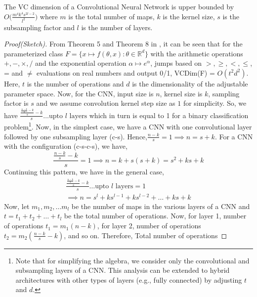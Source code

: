 \documentclass[11pt,a4paper]{article}
\begin{document}
\begin{theorem}\label{Theorem:cnn_vc}
The VC dimension of a Convolutional Neural Network is upper bounded by $O\Big(\frac{m^4k^4s^{2l-2}}{l^2}\Big)$ where $m$ is the total number of maps, $k$ is the kernel size, $s$ is the subsampling factor and $l$ is the number of layers.
\end{theorem}
\begin{proof}[Proof(Sketch)]
From Theorem 5 and Theorem 8 in \cite{Bartlett_vapnik-chervonenkisdimension}, it can be seen that for the parameterized class $F = \{x \longmapsto f(\theta, x) : \theta \in {\mathbb{R}}^d\}$  with the arithmetic operations $+, -, \times, /$ and the exponential operation $\alpha \longmapsto e^{\alpha}$, jumps based on $>, \geq, <, \leq$, = and $\neq$ evaluations on real numbers and output 0/1, VCDim(F) = $O(t^2d^2)$. Here, $t$ is the number of operations and $d$ is the dimensionality of the adjustable parameter space. Now, for the CNN, input size is $n$, kernel size is $k$, sampling factor is $s$ and we assume convolution kernel step size as $1$ for simplicity. So, we have $\frac{\frac{\frac{n-k}{s}-k}{s}-k}{s} \ldots \text{upto $l$ layers} $ which in turn is equal to 1 for a binary classification problem\footnote{Note that for simplifying the algebra, we consider only the convolutional and subsampling layers of a CNN. This analysis can be extended to hybrid architectures with other types of layers (e.g., fully connected) by adjusting $t$ and $d$.}.
Now, in the simplest case, we have a CNN with one convolutional layer followed by one subsampling layer (c-s). Hence,$\frac{n-k}{s} = 1  \implies n = s + k$.
For a CNN with the configuration (c-s-c-s), we have,
\begin{equation}
\frac{\frac{n-k}{s}-k}{s} = 1  \implies n = k+s(s + k) = s^2 + ks + k
\end{equation}
Continuing this pattern, we have in the general case, 
\begin{equation}
\begin{split}
\frac{\frac{\frac{n-k}{s}-k}{s}-k}{s} \ldots \text{upto $l$ layers} = 1 \\
\implies n = s^l + ks^{l-1} + ks^{l-2} + \ldots + ks + k
\end{split}
\end{equation} 
Now, let $m_1, m_2, \ldots m_l$ be the number of maps in the various layers of a CNN and
$t = t_1 + t_2 + \ldots + t_l$ be the total number of operations.
Now, for layer 1, number of operations $t_1 = m_1(n-k)$, for layer 2, number of operations $t_2 = m_2(\frac{n-k}{s}-k)$, and so on. Therefore, Total number of operations

\end{proof}
\end{document}
